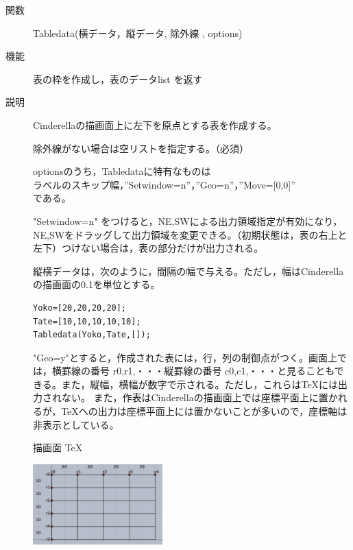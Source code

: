 \documentclass[papersize,a4paper,10pt,uplatex]{jsarticle}
\begin{document}
\begin{description}

\hypertarget{tabledata}{}
\item[関数]Tabledata(横データ，縦データ, 除外線 , options)
\item[機能]表の枠を作成し，表のデータlist を返す
\item[説明]Cinderellaの描画面上に左下を原点とする表を作成する。

除外線がない場合は空リストを指定する。（必須）

optionsのうち，Tabledataに特有なものは\\
\hspace*{3zw}ラベルのスキップ幅，''Setwindow=n''，''Geo=n''，''Move=[0,0]''\\
である。

"Setwindow=n" をつけると，NE,SWによる出力領域指定が有効になり，NE,SWをドラッグして出力領域を変更できる。（初期状態は，表の右上と左下）つけない場合は，表の部分だけが出力される。

縦横データは，次のように，間隔の幅で与える。ただし，幅はCinderellaの描画面の0.1を単位とする。

\begin{verbatim}
Yoko=[20,20,20,20];
Tate=[10,10,10,10,10];
Tabledata(Yoko,Tate,[]);
 \end{verbatim}



"Geo=y"とすると，作成された表には，行，列の制御点がつく。画面上では，横罫線の番号 r0,r1,・・・縦罫線の番号 c0,c1,・・・と見ることもできる。また，縦幅，横幅が数字で示される。ただし，これらは\TeX には出力されない。
また，作表はCinderellaの描画面上では座標平面上に置かれるが，\TeX への出力は座標平面上には置かないことが多いので，座標軸は非表示としている。

\hspace{25mm} 描画面 \hspace{45mm} TeX

\hspace{5mm}\includegraphics[bb=0 0 403.52 249.51 , width=5cm]{Fig/table01.pdf} \hspace{10mm} \\



\end{description}
\end{document}
